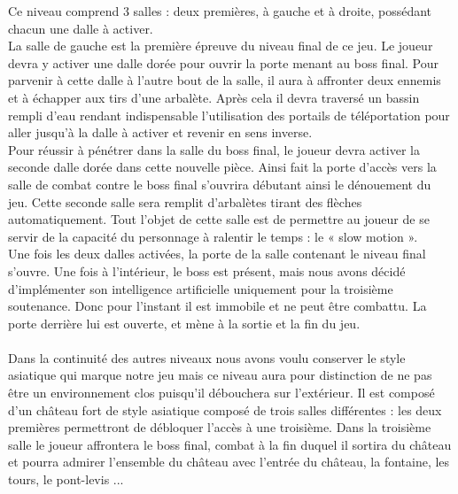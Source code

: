 \documentclass[12pt]{article}
\begin{document}
Ce niveau comprend 3 salles : deux premières, à gauche et à droite, possédant chacun une dalle à activer. \\
La salle de gauche est la première épreuve du niveau final de ce jeu. Le joueur devra y activer une dalle dorée pour ouvrir la porte menant au boss final. Pour parvenir à cette dalle à l'autre bout de la salle, il aura à affronter deux ennemis et à échapper aux tirs d'une arbalète. Après cela il devra traversé un bassin rempli d'eau rendant indispensable l'utilisation des portails de téléportation pour aller jusqu'à la dalle à activer et revenir en sens inverse.\\
Pour réussir à pénétrer dans la salle du boss final, le joueur devra activer la seconde dalle dorée dans cette nouvelle pièce. Ainsi fait la porte d'accès vers la salle de combat contre le boss final s'ouvrira débutant ainsi le dénouement du jeu. Cette seconde salle sera remplit d'arbalètes tirant des flèches automatiquement. Tout l'objet de cette salle est de permettre au joueur de se servir de la capacité du personnage à ralentir le temps : le « slow motion ».\\
Une fois les deux dalles activées, la porte de la salle contenant le niveau final s'ouvre. Une fois à l'intérieur, le boss est présent, mais nous avons décidé d'implémenter son intelligence artificielle uniquement pour la troisième soutenance. Donc pour l'instant il est immobile et ne peut être combattu. La porte derrière lui est ouverte, et mène à la sortie et la fin du jeu.\\\\
Dans la continuité des autres niveaux nous avons voulu conserver le style asiatique qui marque notre jeu mais ce niveau aura pour distinction de ne pas être un environnement clos puisqu'il débouchera sur l'extérieur. Il est composé d'un château fort de style asiatique composé de trois salles différentes : les deux premières permettront de débloquer l'accès à une troisième. Dans la troisième salle le joueur affrontera le boss final, combat à la fin duquel il sortira du château et pourra admirer l'ensemble du château avec l'entrée du château, la fontaine, les tours, le pont-levis ...\\\\
\end{document}
